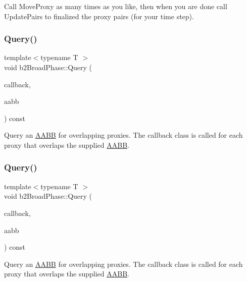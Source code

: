 Call Move\+Proxy as many times as you like, then when you are done call Update\+Pairs to finalized the proxy pairs (for your time step). \mbox{\label{classb2BroadPhase_a187586ea98b9d16e5ef6e12fa31f8de2}} 
\subsubsection{\texorpdfstring{Query()}{Query()}\hspace{0.1cm}{\footnotesize\ttfamily [1/2]}}
{\footnotesize\ttfamily template$<$typename T $>$ \\
void b2\+Broad\+Phase\+::\+Query (\begin{DoxyParamCaption}\item[{T $\ast$}]{callback,  }\item[{const \hyperlink{structb2AABB}{b2\+A\+A\+BB} \&}]{aabb }\end{DoxyParamCaption}) const}

Query an \hyperlink{classAABB}{A\+A\+BB} for overlapping proxies. The callback class is called for each proxy that overlaps the supplied \hyperlink{classAABB}{A\+A\+BB}. \mbox{\label{classb2BroadPhase_a187586ea98b9d16e5ef6e12fa31f8de2}} 
\subsubsection{\texorpdfstring{Query()}{Query()}\hspace{0.1cm}{\footnotesize\ttfamily [2/2]}}
{\footnotesize\ttfamily template$<$typename T $>$ \\
void b2\+Broad\+Phase\+::\+Query (\begin{DoxyParamCaption}\item[{T $\ast$}]{callback,  }\item[{const \hyperlink{structb2AABB}{b2\+A\+A\+BB} \&}]{aabb }\end{DoxyParamCaption}) const\hspace{0.3cm}{\ttfamily [inline]}}

Query an \hyperlink{classAABB}{A\+A\+BB} for overlapping proxies. The callback class is called for each proxy that overlaps the supplied \hyperlink{classAABB}{A\+A\+BB}. \mbox{\label{classb2BroadPhase_ae65392ea91c7d0839ed5312f78b2837a}} 
